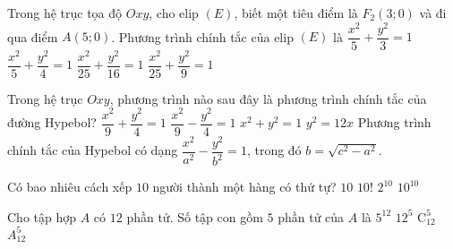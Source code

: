 \begin{ex}%
	Trong hệ trục tọa độ $Oxy$, cho elip $(E)$, biết một tiêu điểm là $F_2(3;0)$ và đi qua điểm $A(5;0)$. Phương trình chính tắc của elip $(E)$ là
	\choice
	{$\dfrac{x^2}{5}+\dfrac{y^2}{3}=1$}
	{$\dfrac{x^2}{5}+\dfrac{y^2}{4}=1$}
	{\True $\dfrac{x^2}{25}+\dfrac{y^2}{16}=1$}
	{$\dfrac{x^2}{25}+\dfrac{y^2}{9}=1$}
\end{ex}
\begin{ex}%
	Trong hệ trục $Oxy$, phương trình nào sau đây là phương trình chính tắc của đường Hypebol?
	\choice
	{$\dfrac{x^2}{9}+\dfrac{y^2}{4}=1$}
	{\True $\dfrac{x^2}{9}-\dfrac{y^2}{4}=1$}
	{$x^2+y^2=1$}
	{$y^2=12x$}
	\loigiai
	{
		Phương trình chính tắc của Hypebol có dạng $\dfrac{x^2}{a^2}-\dfrac{y^2}{b^2}=1$, trong đó $b=\sqrt{c^2-a^2}$.
	}
\end{ex}

\begin{ex}%
	Có bao nhiêu cách xếp $10$ người thành một hàng có thứ tự?
	\choice
	{$10$}
	{\True $10!$}
	{$2^{10}$}
	{$10^{10}$}
\end{ex}

\begin{ex}%
	Cho tập hợp $A$ có $12$ phần tử. Số tập con gồm $5$ phần tử của $A$ là
	\choice
	{$5^{12}$}
	{$12^5$}
	{\True $\mathrm{C}_{12}^5$}
	{$A_{12}^5$}
\end{ex}


